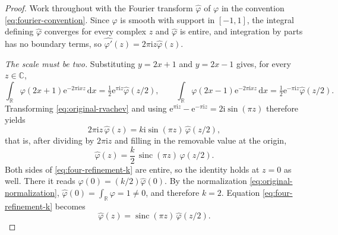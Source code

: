 \documentclass[11pt,oneside]{article}
\theoremstyle{definition}
\theoremstyle{remark}
\newcommand{\R}{\mathbb R}
\newcommand{\C}{\mathbb C}
\newcommand{\sinc}{\operatorname{sinc}}
\newcommand{\e}{\mathrm e}
\newcommand{\ii}{\mathrm i}
\newcommand{\dd}{\,\mathrm d}
\begin{document}
\begin{proof}
Work throughout with the Fourier transform $\widehat\varphi$ of $\varphi$ in the convention
\eqref{eq:fourier-convention}.  Since $\varphi$ is smooth with support in $[-1,1]$, the
integral defining $\widehat\varphi$ converges for every complex $z$ and $\widehat\varphi$ is
entire, and integration by parts has no boundary terms, so
$\widehat{\varphi'}(z)=2\pi\ii z\widehat\varphi(z)$.

\emph{The scale must be two.}  Substituting $y=2x+1$ and $y=2x-1$ gives, for every $z\in\C$,
\begin{equation}
 \int_\R\varphi(2x+1)\e^{-2\pi\ii xz}\dd x
 =\tfrac12\e^{\pi\ii z}\widehat\varphi(z/2),
 \qquad
 \int_\R\varphi(2x-1)\e^{-2\pi\ii xz}\dd x
 =\tfrac12\e^{-\pi\ii z}\widehat\varphi(z/2).
                                     \label{eq:four-shift-transforms}
\end{equation}
Transforming \eqref{eq:original-rvachev} and using
$\e^{\pi\ii z}-\e^{-\pi\ii z}=2\ii\sin(\pi z)$ therefore yields
\begin{equation}
 2\pi\ii z\,\widehat\varphi(z)=k\ii\sin(\pi z)\,\widehat\varphi(z/2),
                                     \label{eq:four-transformed-equation}
\end{equation}
that is, after dividing by $2\pi\ii z$ and filling in the removable value at the origin,
\begin{equation}
 \widehat\varphi(z)=\frac k2\,\sinc(\pi z)\,\widehat\varphi(z/2).
                                     \label{eq:four-refinement-k}
\end{equation}
Both sides of \eqref{eq:four-refinement-k} are entire, so the identity holds at $z=0$ as
well.  There it reads $\widehat\varphi(0)=(k/2)\widehat\varphi(0)$.  By the normalization
\eqref{eq:original-normalization}, $\widehat\varphi(0)=\int_\R\varphi=1\ne0$, and therefore $k=2$.
Equation \eqref{eq:four-refinement-k} becomes
\begin{equation}
 \widehat\varphi(z)=\sinc(\pi z)\,\widehat\varphi(z/2).
                                     \label{eq:four-refinement}
\end{equation}


\end{proof}
\end{document}
